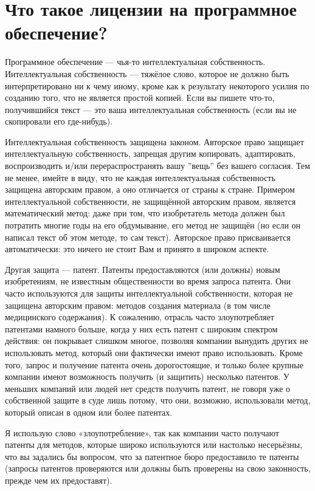 \documentclass[10pt]{book}
\begin{document}
\section{Что такое лицензии на программное обеспечение?}

Программное обеспечение --- чья-то интеллектуальная собственность. Интеллектуальная собственность --- тяжёлое слово, которое не должно быть интерпретировано ни к чему иному, кроме как к результату некоторого усилия по созданию того, что не является простой копией. Если вы пишете что-то, получившийся текст — это ваша интеллектуальная собственность (если вы не скопировали его где-нибудь).

Интеллектуальная собственность защищена законом. Авторское право защищает  интеллектуальную собственность, запрещая другим копировать, адаптировать, воспроизводить и/или перераспространять вашу ''вещь'' без вашего согласия. Тем не менее, имейте в виду, что не каждая интеллектуальная собственность защищена авторским правом, а оно отличается от страны к стране. Примером интеллектуальной собственности,  не защищённой авторским правом, является математический метод: даже при том, что изобретатель метода должен был потратить многие годы на его обдумывание, его метод не защищён (но если он написал текст об этом методе, то сам текст). Авторское право присваивается автоматически: это ничего не стоит Вам и принято в широком аспекте.

Другая защита --- патент. Патенты предоставляются (или должны) новым изобретениям,  не известным общественности во время запроса патента. Они часто используются для защиты интеллектуальной собственности, которая не защищена авторским правом: методов создания материала (в том числе медицинского содержания). К сожалению, отрасль часто злоупотребляет патентами намного больше, когда у них есть патент с широким спектром действия: он покрывает слишком многое, позволяя компании вынудить других не использовать метод, который они фактически имеют право использовать. Кроме того,  запрос и получение патента очень дорогостоящие, и только более крупные компании имеют возможность получить (и защитить) несколько патентов. У меньших компаний или людей нет средств получить патент, не говоря уже о собственной защите в суде лишь потому, что они, возможно, использовали метод, который описан в одном или более патентах.

Я использую слово «злоупотребление», так как компании часто получают патенты для методов, которые широко используются или настолько несерьёзны, что вы задались бы вопросом,  что за патентное бюро предоставило те патенты (запросы патентов проверяются или должны быть проверены на свою законность, прежде чем их предоставят).
\end{document}
